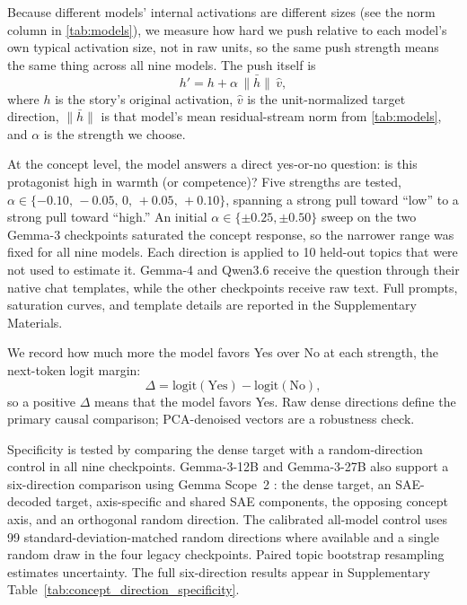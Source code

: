 \documentclass[twocolumn]{article}
\begin{document}
Because different models' internal activations are different sizes (see
the norm column in \autoref{tab:models}), we measure how hard we push
relative to each model's own typical activation size, not in raw units, so
the same push strength means the same thing across all nine models. The
push itself is
\begin{equation*}
  h' = h + \alpha\,\bar{\|h\|}\,\hat{v},
\end{equation*}
where $h$ is the story's original activation, $\hat{v}$ is the
unit-normalized target direction, $\bar{\|h\|}$ is that model's mean
residual-stream norm from \autoref{tab:models}, and $\alpha$ is the
strength we choose.

At the concept level, the model answers a direct yes-or-no question: is
this protagonist high in warmth (or competence)? Five strengths are
tested, $\alpha \in \{-0.10,\,-0.05,\,0,\,+0.05,\,+0.10\}$, spanning a
strong pull toward ``low'' to a strong pull toward ``high.'' An initial
$\alpha \in \{\pm0.25,\pm0.50\}$ sweep on the two Gemma-3 checkpoints
saturated the concept response, so the narrower range was fixed for all
nine models. Each direction is applied to 10 held-out topics that were not
used to estimate it. Gemma-4 and Qwen3.6 receive the question through their
native chat templates, while the other checkpoints receive raw text. Full
prompts, saturation curves, and template details are reported in the
Supplementary Materials.

We record how much more the model favors Yes over No at each
strength, the next-token logit margin:
\begin{equation*}
  \Delta = \mathrm{logit}(\text{Yes}) - \mathrm{logit}(\text{No}),
\end{equation*}
so a positive $\Delta$ means that the model favors Yes. Raw dense directions
define the primary causal comparison; PCA-denoised vectors are a robustness
check.

Specificity is tested by comparing the dense target with a random-direction
control in all nine checkpoints. Gemma-3-12B and Gemma-3-27B also support a
six-direction comparison using Gemma Scope~2 \citep{deepmind2025gemmascope2}:
the dense target, an SAE-decoded target, axis-specific and shared SAE
components, the opposing concept axis, and an orthogonal random direction.
The calibrated all-model control uses 99 standard-deviation-matched random
directions where available and a single random draw in the four legacy
checkpoints. Paired topic bootstrap resampling estimates uncertainty. The
full six-direction results appear in Supplementary
Table~\ref{tab:concept_direction_specificity}.
\end{document}
